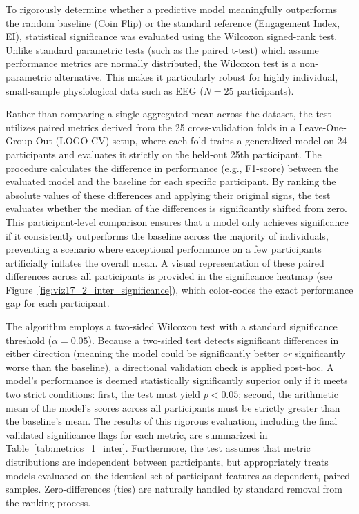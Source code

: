 To rigorously determine whether a predictive model meaningfully outperforms the random baseline (Coin Flip) or the standard reference (Engagement Index, EI), statistical significance was evaluated using the Wilcoxon signed-rank test. Unlike standard parametric tests (such as the paired t-test) which assume performance metrics are normally distributed, the Wilcoxon test is a non-parametric alternative. This makes it particularly robust for highly individual, small-sample physiological data such as EEG ($N=25$ participants).

Rather than comparing a single aggregated mean across the dataset, the test utilizes paired metrics derived from the 25 cross-validation folds in a Leave-One-Group-Out (LOGO-CV) setup, where each fold trains a generalized model on 24 participants and evaluates it strictly on the held-out 25th participant. The procedure calculates the difference in performance (e.g., F1-score) between the evaluated model and the baseline for each specific participant. By ranking the absolute values of these differences and applying their original signs, the test evaluates whether the median of the differences is significantly shifted from zero. This participant-level comparison ensures that a model only achieves significance if it consistently outperforms the baseline across the majority of individuals, preventing a scenario where exceptional performance on a few participants artificially inflates the overall mean. A visual representation of these paired differences across all participants is provided in the significance heatmap (see Figure~\ref{fig:viz17_2_inter_significance}), which color-codes the exact performance gap for each participant.

The algorithm employs a two-sided Wilcoxon test with a standard significance threshold ($\alpha = 0.05$). Because a two-sided test detects significant differences in either direction (meaning the model could be significantly better \textit{or} significantly worse than the baseline), a directional validation check is applied post-hoc. A model's performance is deemed statistically significantly superior only if it meets two strict conditions: first, the test must yield $p < 0.05$; second, the arithmetic mean of the model's scores across all participants must be strictly greater than the baseline's mean. The results of this rigorous evaluation, including the final validated significance flags for each metric, are summarized in Table~\ref{tab:metrics_1_inter}. Furthermore, the test assumes that metric distributions are independent between participants, but appropriately treats models evaluated on the identical set of participant features as dependent, paired samples. Zero-differences (ties) are naturally handled by standard removal from the ranking process.
